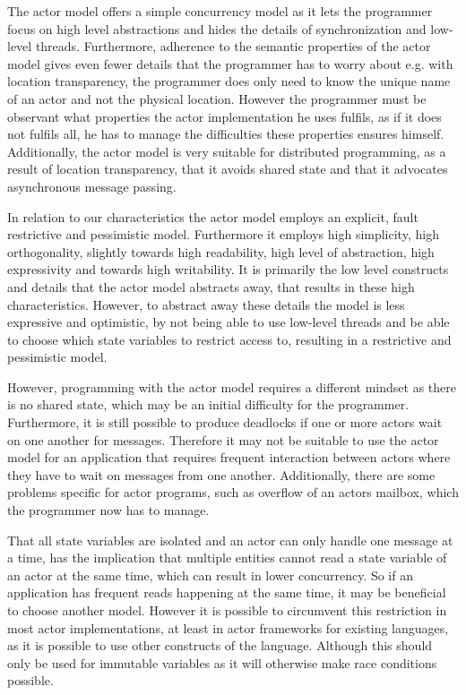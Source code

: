 The actor model offers a simple concurrency model as it lets the programmer focus on high level abstractions and hides the details of synchronization and low-level threads. Furthermore, adherence to the semantic properties of the actor model gives even fewer details that the programmer has to worry about e.g. with location transparency, the programmer does only need to know the unique name of an actor and not the physical location. However the programmer must be observant what properties the actor implementation he uses fulfils, as if it does not fulfils all, he has to manage the difficulties these properties ensures himself. Additionally, the actor model is very suitable for distributed programming, as a result of location transparency, that it avoids shared state and that it advocates asynchronous message passing.

In relation to our characteristics the actor model employs an explicit, fault restrictive and pessimistic model. Furthermore it employs high simplicity, high orthogonality, slightly towards high readability, high level of abstraction, high expressivity and towards high writability. It is primarily the low level constructs and details that the actor model abstracts away, that results in these high characteristics. However, to abstract away these details the model is less expressive and optimistic, by not being able to use low-level threads and be able to choose which state variables to restrict access to, resulting in a restrictive and pessimistic model.

However, programming with the actor model requires a different mindset as there is no shared state, which may be an initial difficulty for the programmer. Furthermore, it is still possible to produce deadlocks if one or more actors wait on one another for messages. Therefore it may not be suitable to use the actor model for an application that requires frequent interaction between actors where they have to wait on messages from one another. Additionally, there are some problems specific for actor programs, such as overflow of an actors mailbox, which the programmer now has to manage. 

That all state variables are isolated and an actor can only handle one message at a time, has the implication that multiple entities cannot read a state variable of an actor at the same time, which can result in lower concurrency. So if an application has frequent reads happening at the same time, it may be beneficial to choose another model. However it is possible to circumvent this restriction in most actor implementations, at least in actor frameworks for existing languages, as it is possible to use other constructs of the language. Although this should only be used for immutable variables as it will otherwise make race conditions possible. %

